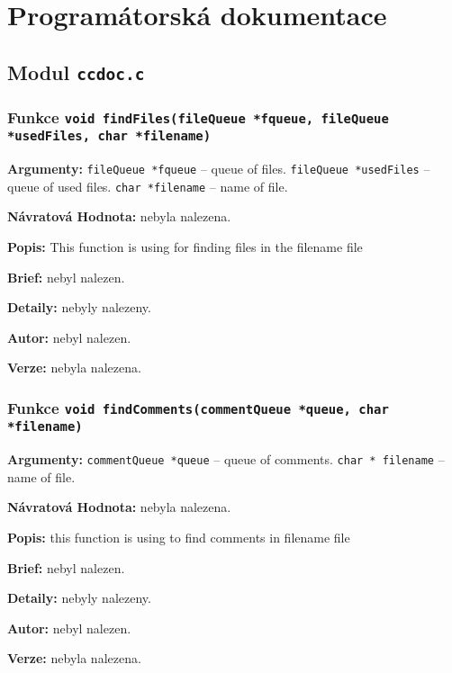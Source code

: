 \documentclass[12pt, a4paper]{article}
\begin{document}
\section{Programátorská dokumentace}
\subsection{Modul \texttt{ccdoc.c}}
\subsubsection{Funkce \texttt{void findFiles(fileQueue *fqueue, fileQueue *usedFiles, char *filename)}}
\textbf{Argumenty: }\verb"fileQueue *fqueue" -- queue of files. \verb"fileQueue *usedFiles" -- queue of used files. \verb"char *filename" -- name of file. \\
\par\noindent
\textbf{Návratová Hodnota: }nebyla nalezena.\\
\par\noindent
\textbf{Popis: }This function is using for finding files in the filename file\\
\par\noindent
\textbf{Brief: }nebyl nalezen.\\
\par\noindent
\textbf{Detaily: }nebyly nalezeny.\\
\par\noindent
\textbf{Autor: }nebyl nalezen.\\
\par\noindent
\textbf{Verze: }nebyla nalezena.\\
\par\noindent
\subsubsection{Funkce \texttt{void findComments(commentQueue *queue, char *filename)}}
\textbf{Argumenty: }\verb"commentQueue *queue" -- queue of comments. \verb"char * filename" -- name of file. \\
\par\noindent
\textbf{Návratová Hodnota: }nebyla nalezena.\\
\par\noindent
\textbf{Popis: }this function is using to find comments in filename file\\
\par\noindent
\textbf{Brief: }nebyl nalezen.\\
\par\noindent
\textbf{Detaily: }nebyly nalezeny.\\
\par\noindent
\textbf{Autor: }nebyl nalezen.\\
\par\noindent
\textbf{Verze: }nebyla nalezena.\\
\par\noindent
\end{document}
